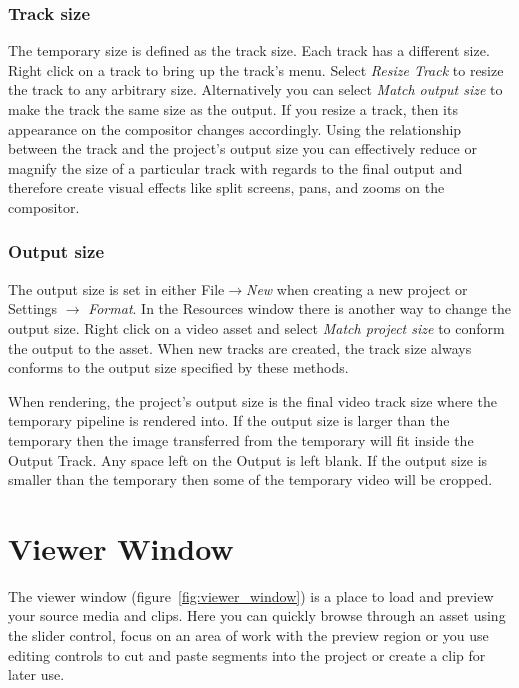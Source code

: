 \subsubsection*{Track size}%
\label{ssub:track_size}

The temporary size is defined as the track size. 
Each track has a different size. 
Right click on a track to bring up the track's menu. 
Select \emph{Resize Track} to resize the track to any arbitrary size. 
Alternatively you can select \emph{Match output size} to make the track the same size as the output. 
If you resize a track, then its appearance on the compositor changes accordingly. 
Using the relationship between the track and the project's output size you can effectively reduce or magnify the size of a particular track with regards to the final output and therefore create visual effects like split screens, pans, and zooms on the compositor.

\subsubsection*{Output size}%
\label{ssub:output_size}


The output size is set in either File$\rightarrow$\emph{New} when creating a new project or Settings $\rightarrow$ \emph{Format}. 
In the Resources window there is another way to change the output size. 
Right click on a video asset and select \emph{Match project size} to conform the output to the asset. 
When new tracks are created, the track size always conforms to the output size specified by these methods.

When rendering, the project's output size is the final video track size where the temporary pipeline is rendered into.  
If the output size is larger than the temporary then the image transferred from the temporary will fit inside the Output Track. 
Any space left on the Output is left blank.  
If the output size is smaller than the temporary then some of the temporary video will be cropped.

\section{Viewer Window}%
\label{sec:viewer_window}

The viewer window (figure~\ref{fig:viewer_window}) is a place to load and preview your source media and clips.  
Here you can quickly browse through an asset using the slider control, focus on an area of work with the preview region or you use editing controls to cut and paste segments into the project or create a clip for later use.

